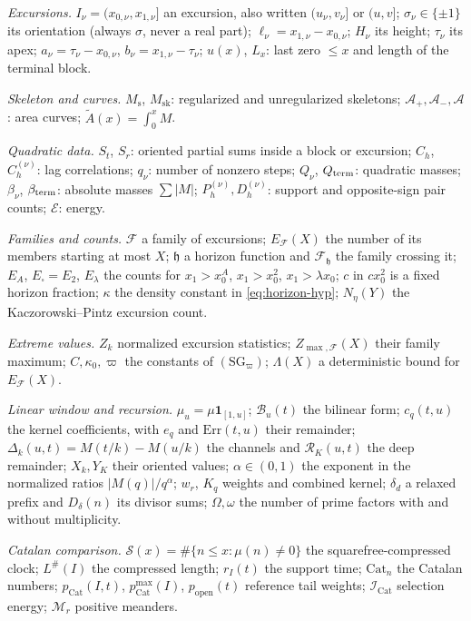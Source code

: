 \documentclass[11pt]{amsart}
\numberwithin{equation}{section}
\theoremstyle{plain}
\theoremstyle{definition}
\theoremstyle{remark}
\newcommand{\Ms}{M_{\mathrm{s}}}
\newcommand{\Msk}{M_{\mathrm{sk}}}
\newcommand{\Ap}{\mathcal{A}_{+}}
\newcommand{\Am}{\mathcal{A}_{-}}
\newcommand{\Anet}{\mathcal{A}}
\newcommand{\Sq}{\mathcal{S}}
\newcommand{\En}{\mathcal{E}}
\newcommand{\F}{\mathcal{F}}
\begin{document}
\smallskip
\noindent\emph{Excursions.}
$I_\nu=(x_{0,\nu},x_{1,\nu}]$ an excursion, also written $(u_\nu,v_\nu]$ or
$(u,v]$; $\sigma_\nu\in\{\pm1\}$ its orientation (always $\sigma$, never a
real part); $\ell_\nu=x_{1,\nu}-x_{0,\nu}$; $H_\nu$ its height; $\tau_\nu$ its
apex; $a_\nu=\tau_\nu-x_{0,\nu}$, $b_\nu=x_{1,\nu}-\tau_\nu$;
$u(x)$, $L_x$: last zero $\le x$ and length of the terminal block.

\smallskip
\noindent\emph{Skeleton and curves.}
$\Ms$, $\Msk$: regularized and unregularized skeletons;
$\Ap,\Am,\Anet$: area curves; $\widetilde A(x)=\int_0^xM$.

\smallskip
\noindent\emph{Quadratic data.}
$S_t$, $S_r$: oriented partial sums inside a block or excursion;
$C_h$, $C_h^{(\nu)}$: lag correlations; $q_\nu$: number of nonzero steps;
$Q_\nu$, $Q_{\rm term}$: quadratic masses; $\beta_\nu$, $\beta_{\rm term}$:
absolute masses $\sum|M|$; $P_h^{(\nu)},D_h^{(\nu)}$: support and
opposite-sign pair counts; $\En$: energy.

\smallskip
\noindent\emph{Families and counts.}
$\F$ a family of excursions; $E_\F(X)$ the number of its members starting at
most $X$; $\mathfrak h$ a horizon function and $\F_{\mathfrak h}$ the family
crossing it; $E_A$, $E_\square=E_2$, $E_\lambda$ the counts for
$x_1>x_0^A$, $x_1>x_0^2$, $x_1>\lambda x_0$; $c$ in $cx_0^2$ is a fixed
horizon fraction; $\kappa$ the density constant in \eqref{eq:horizon-hyp};
$N_\eta(Y)$ the Kaczorowski--Pintz excursion count.

\smallskip
\noindent\emph{Extreme values.}
$Z_k$ normalized excursion statistics; $Z_{\max,\F}(X)$ their family maximum;
$C,\kappa_0,\varpi$ the constants of $(\mathrm{SG}_\varpi)$;
$\Lambda(X)$ a deterministic bound for $E_\F(X)$.

\smallskip
\noindent\emph{Linear window and recursion.}
$\mu_u=\mu\mathbf 1_{[1,u]}$; $\mathcal B_u(t)$ the bilinear form;
$c_q(t,u)$ the kernel coefficients, with $e_q$ and $\mathrm{Err}(t,u)$
their remainder; $\Delta_k(u,t)=M(t/k)-M(u/k)$ the channels and
$\mathcal R_K(u,t)$ the deep remainder; $X_k,Y_K$ their oriented values;
$\alpha\in(0,1)$ the exponent in the normalized ratios
$|M(q)|/q^\alpha$; $w_r$, $K_q$ weights and combined kernel;
$\delta_d$ a relaxed prefix and $D_\delta(n)$ its divisor sums;
$\Omega,\omega$ the number of prime factors with and without multiplicity.

\smallskip
\noindent\emph{Catalan comparison.}
$\Sq(x)=\#\{n\le x:\mu(n)\ne0\}$ the squarefree-compressed clock;
$L^\#(I)$ the compressed length; $r_I(t)$ the support time;
$\mathrm{Cat}_n$ the Catalan numbers; $p_{\mathrm{Cat}}(I,t)$,
$p^{\max}_{\mathrm{Cat}}(I)$, $p_{\mathrm{open}}(t)$ reference tail weights;
$\mathcal I_{\mathrm{Cat}}$ selection energy; $\mathcal M_r$ positive meanders.
\end{document}
